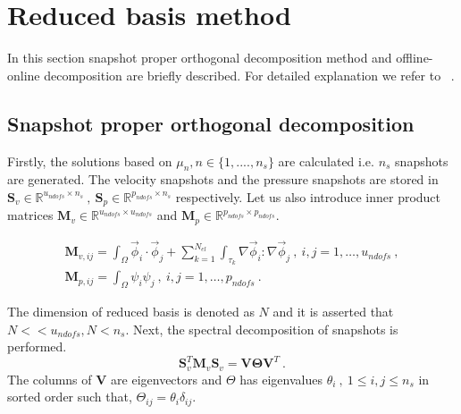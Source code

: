 \documentclass[graybox]{svmult}
\begin{document}
\section{Reduced basis method}

In this section snapshot proper orthogonal decomposition method and offline-online decomposition are briefly described. For detailed explanation we refer to ~\cite{CRBM}.

\subsection{Snapshot proper orthogonal decomposition}\label{POD_section}

Firstly, the solutions based on $\mu_n, n \in \lbrace 1,....,n_s \rbrace$ are calculated i.e. $n_s$ snapshots are generated. The velocity snapshots and the pressure snapshots are stored in $\bm{S}_v \in \mathbb{R}^{u_{ndofs} \times n_s} \ , \ \bm{S}_p \in \mathbb{R}^{p_{ndofs} \times n_s}$ respectively. Let us also introduce inner product matrices $\bm{M}_v \in \mathbb{R}^{u_{ndofs} \times u_{ndofs}}$ and $\bm{M}_p \in \mathbb{R}^{p_{ndofs} \times p_{ndofs}}$.

\begin{gather*}
\bm{M}_{v,ij} = \int_{\Omega} \overrightarrow{\phi}_i \cdot \overrightarrow{\phi}_j + \sum_{k=1}^{N_{el}} \int_{\tau_k} \nabla \overrightarrow{\phi}_i : \nabla \overrightarrow{\phi}_j \ , \ i,j = 1, \ldots, u_{ndofs} \ , \\
\bm{M}_{p,ij} = \int_{\Omega} \psi_i \psi_j \ , \ i,j = 1, \ldots, p_{ndofs} \ .
\end{gather*}

The dimension of reduced basis is denoted as $N$ and it is asserted that $N << u_{ndofs}, N < n_s$. Next, the spectral decomposition of snapshots is performed.
\begin{equation}\label{snapshot_eigen_value}
\bm{S}_v^T \bm{M}_v \bm{S}_v = \bm{V} \bm{\Theta} \bm{V}^T \ .
\end{equation}
The columns of $\bm{V}$ are eigenvectors and $\Theta$ has eigenvalues $\theta_i \ , \ 1 \leq i,j \leq n_s$ in sorted order such that, $\Theta_{ij} = \theta_i \delta_{ij}$.
\end{document}
